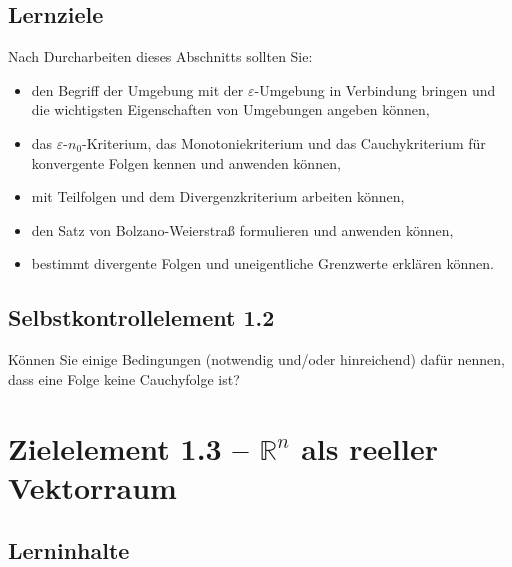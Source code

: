 \documentclass[a4paper,12pt]{article}
\begin{document}
\subsection*{Lernziele}

Nach Durcharbeiten dieses Abschnitts sollten Sie:
\begin{itemize}
  \item den Begriff der Umgebung mit der $\varepsilon$-Umgebung in Verbindung bringen
        und die wichtigsten Eigenschaften von Umgebungen angeben können,
  \item das $\varepsilon$-$n_0$-Kriterium, das Monotonie\-kriterium und das Cauchykriterium
        für konvergente Folgen kennen und anwenden können,
  \item mit Teilfolgen und dem Divergenzkriterium arbeiten können,
  \item den Satz von Bolzano-Weierstraß formulieren und anwenden können,
  \item bestimmt divergente Folgen und uneigentliche Grenzwerte erklären können.
\end{itemize}

\subsection*{Selbstkontrollelement 1.2}

Können Sie einige Bedingungen (notwendig und/oder hinreichend) dafür nennen,
dass eine Folge keine Cauchyfolge ist?

\newpage

\section*{Zielelement 1.3 -- $\mathbb{R}^n$ als reeller Vektorraum}

\subsection*{Lerninhalte}
\end{document}
